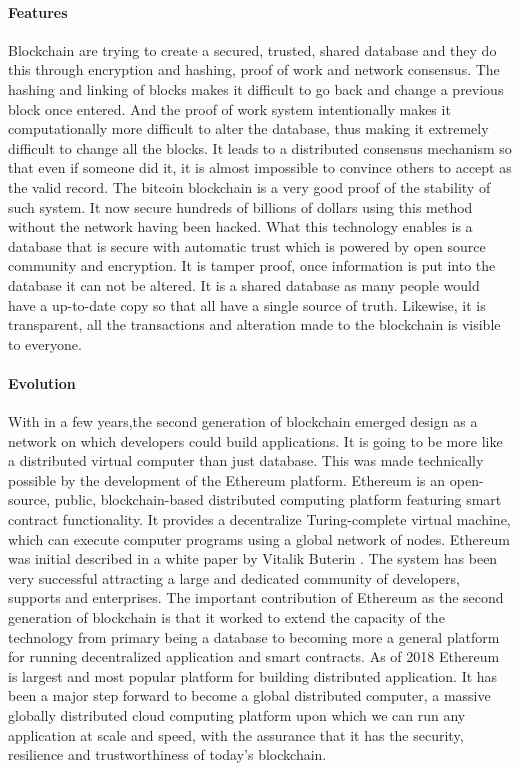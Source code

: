 \documentclass [12pt]{article}
\begin{document}
\paragraph{Features}
Blockchain are trying to create a secured, trusted, 
shared database and they do this through encryption and hashing,
proof of work and network consensus. The hashing and linking of blocks 
makes it difficult to go back and change a previous block once entered. 
And the proof of work system intentionally makes it computationally more difficult to alter the database,
thus making it extremely difficult to change all the blocks. It leads to a distributed consensus mechanism so that even if someone did it,
it is almost impossible to convince others to accept as the valid record. The bitcoin blockchain is a very good proof of the stability of such system.
It now secure hundreds of billions of dollars using this method without the network having been hacked. 
What this technology enables is a database that is secure with automatic trust 
which is powered by open source community and encryption.
It is tamper proof, once information is put into the database it can not be altered. 
It is a shared database as many people would have a up-to-date copy so that all have a single source of truth.
Likewise, it is transparent, all the transactions and alteration made to the blockchain is visible to everyone.
\paragraph{Evolution}With in a few years,the second generation of blockchain emerged design as a network on which developers could build applications. 
It is going to be more like a distributed virtual computer than just database.
This was made technically possible by the development of the Ethereum platform. 
Ethereum is an open-source, public, blockchain-based distributed computing platform featuring smart contract functionality.
It provides a decentralize Turing-complete virtual machine, which can execute computer programs using a global network of nodes.
Ethereum was initial described in a white paper by Vitalik Buterin \cite{buterin2013ethereum}. 
The system has been very successful attracting a large and dedicated community of developers, supports and enterprises.
The important contribution of Ethereum as the second generation of blockchain is that 
it worked to extend the capacity of the technology from primary
being a database to becoming more a general platform for running decentralized application and smart contracts.
As of 2018 Ethereum is largest and most popular platform for building distributed application. 
It has been a major step forward to become a global distributed computer, 
a massive globally distributed cloud computing platform upon which we can run any application at scale and speed,
with the assurance that it has the security, resilience and trustworthiness of today's blockchain.
\end{document}

